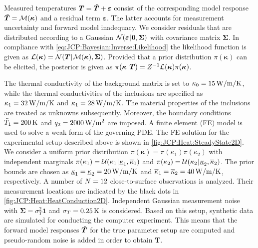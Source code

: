 Measured temperatures \(\bm{T} = \tilde{\bm{T}} + \bm{\varepsilon}\) consist of the corresponding model response \(\tilde{\bm{T}} = \mathcal{M}(\bm{\kappa})\) and a residual term \(\bm{\varepsilon}\).
The latter accounts for measurement uncertainty and forward model inadequacy.
We consider residuals that are distributed according to a Gaussian \(\mathcal{N}(\bm{\varepsilon} {\:\!}|{\:\!} \bm{0},\bm{\Sigma})\) with covariance matrix \(\bm{\Sigma}\).
In compliance with \cref{eq:JCP:Bayesian:Inverse:Likelihood} the likelihood function is given as \(\mathcal{L}(\bm{\kappa}) = \mathcal{N}(\bm{T} {\:\!}|{\:\!} \mathcal{M}(\bm{\kappa}),\bm{\Sigma})\).
Provided that a prior distribution \(\pi(\bm{\kappa})\) can be elicited, the posterior is given as \(\pi(\bm{\kappa} {\:\!}|{\:\!} \bm{T}) = Z^{-1} \mathcal{L}(\bm{\kappa}) \pi(\bm{\kappa})\).
\par %
The thermal conductivity of the background matrix is set to \(\kappa_0 = \unit[15]{W/m/K}\),
while the thermal conductivities of the inclusions are specified as \(\kappa_1 = \unit[32]{W/m/K}\) and \(\kappa_1 = \unit[28]{W/m/K}\).
The material properties of the inclusions are treated as unknowns subsequently.
Moreover, the boundary conditions \(\perfect{T}_1 = \unit[200]{K}\) and \(q_2 = \unit[2000]{W/m^2}\) are imposed.
A finite element (FE) model is used to solve a weak form of the governing PDE.
The FE solution for the experimental setup described above is shown in \cref{fig:JCP:Heat:SteadyState2D}.
We consider a uniform prior distribution \(\pi(\bm{\kappa}) = \pi(\kappa_1) \pi(\kappa_2)\) with independent marginals
\(\pi(\kappa_1) = \mathcal{U}(\kappa_1 {\:\!}|{\:\!} \underline{\kappa}_1,\overline{\kappa}_1)\) and \(\pi(\kappa_2) = \mathcal{U}(\kappa_2 {\:\!}|{\:\!} \underline{\kappa}_2,\overline{\kappa}_2)\).
The prior bounds are chosen as \(\underline{\kappa}_1 = \underline{\kappa}_2 = \unit[20]{W/m/K}\) and \(\overline{\kappa}_1 = \overline{\kappa}_2 = \unit[40]{W/m/K}\), respectively.
A number of \(N = 12\) close-to-surface observations is analyzed.
Their measurement locations are indicated by the black dots in \cref{fig:JCP:Heat:HeatConduction2D}.
Independent Gaussian measurement noise with \(\bm{\Sigma} = \sigma_T^2 \bm{1}\) and \(\sigma_T = \unit[0.25]{K}\) is considered.
Based on this setup, synthetic data are simulated for conducting the computer experiment.
This means that the forward model responses \(\tilde{\bm{T}}\) for the true parameter setup are computed and pseudo-random noise is added in order to obtain \(\bm{T}\).
